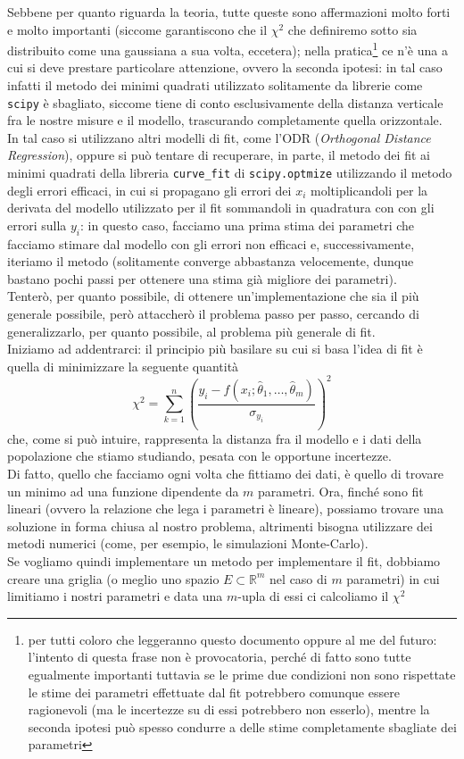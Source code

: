 \documentclass{report}
\begin{document}
Sebbene per quanto riguarda la teoria, tutte queste sono affermazioni molto forti e molto importanti (siccome garantiscono che il $\chi^2$ che definiremo sotto sia distribuito come una gaussiana a sua volta, eccetera); nella pratica\footnote{per tutti coloro che leggeranno questo documento oppure al me del futuro: l'intento di questa frase non è provocatoria, perché di fatto sono tutte egualmente importanti tuttavia se le prime due condizioni non sono rispettate le stime dei parametri effettuate dal fit potrebbero comunque essere ragionevoli (ma le incertezze su di essi potrebbero non esserlo), mentre la seconda ipotesi può spesso condurre a delle stime completamente sbagliate dei parametri} ce n'è una a cui si deve prestare particolare attenzione, ovvero la seconda ipotesi: in tal caso infatti il metodo dei minimi quadrati utilizzato solitamente da librerie come \texttt{scipy} è sbagliato, siccome tiene di conto esclusivamente della distanza verticale fra le nostre misure e il modello, trascurando completamente quella orizzontale. In tal caso si utilizzano altri modelli di fit, come l'ODR (\emph{Orthogonal Distance Regression}), oppure si può tentare di recuperare, in parte, il metodo dei fit ai minimi quadrati della libreria \texttt{curve\_fit} di \texttt{scipy.optmize} utilizzando il metodo degli errori efficaci, in cui si propagano gli errori dei $x_i$ moltiplicandoli per la derivata del modello utilizzato per il fit sommandoli in quadratura con con gli errori sulla $y_i$: in questo caso, facciamo una prima stima dei parametri che facciamo stimare dal modello con gli errori non efficaci e, successivamente, iteriamo il metodo (solitamente converge abbastanza velocemente, dunque bastano pochi passi per ottenere una stima già migliore dei parametri). \\
Tenterò, per quanto possibile, di ottenere un'implementazione che sia il più generale possibile, però attaccherò il problema passo per passo, cercando di generalizzarlo, per quanto possibile, al problema più generale di fit. \\
Iniziamo ad addentrarci: il principio più basilare su cui si basa l'idea di fit è quella di minimizzare la seguente quantità
\begin{equation}
	\chi^2 = \sum_{k=1}^{n} \left( \frac{y_i - f(x_i; \hat{\theta}_1, \ldots, \hat{\theta}_m)}{\sigma_{y_i}} \right)^2 
\end{equation}
che, come si può intuire, rappresenta la distanza fra il modello e i dati della popolazione che stiamo studiando, pesata con le opportune incertezze. \\
Di fatto, quello che facciamo ogni volta che fittiamo dei dati, è quello di trovare un minimo ad una funzione dipendente da $m$ parametri. Ora, finché sono fit lineari (ovvero la relazione che lega i parametri è lineare), possiamo trovare una soluzione in forma chiusa al nostro problema, altrimenti bisogna utilizzare dei metodi numerici (come, per esempio, le simulazioni Monte-Carlo). \\
Se vogliamo quindi implementare un metodo per implementare il fit, dobbiamo creare una griglia (o meglio uno spazio $E \subset \mathbb{R}^m$ nel caso di $m$ parametri) in cui limitiamo i nostri parametri e data una $m$-upla di essi ci calcoliamo il $\chi^2$
\end{document}
